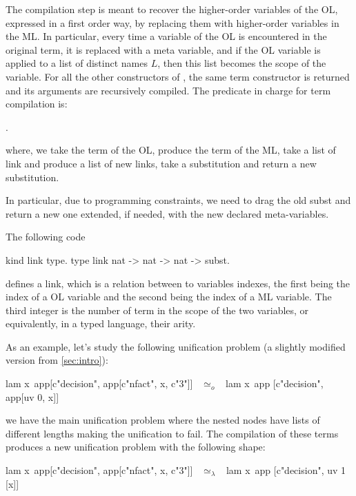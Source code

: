 \documentclass[sigconf,natbib=false,review]{acmart}
\newcommand{\UnifRel}{\ensuremath{\simeq}}
\newcommand{\Uo}{\ensuremath{\UnifRel_o}\xspace}
\newcommand{\Ue}{\ensuremath{\UnifRel_\lambda}\xspace}
\begin{document}
The compilation step is meant to recover the higher-order variables of the OL,
expressed in a first order way, by replacing them with higher-order variables in
the ML. In particular, every time a variable of the OL is encountered in the
original term, it is replaced with a meta variable, and if the OL variable is
applied to a list of distinct names $L$, then this list becomes the scope of the variable. 
For all the other constructors of
, the same term constructor is returned and its arguments are
recursively compiled. The predicate in charge for term compilation is:

. 

\noindent
where, we take the term of the OL, produce the term of the ML, take a list
of link and produce a list of new links, take a substitution and return a 
new substitution.

In particular, due to programming constraints, we need to drag the old subst and
return a new one extended, if needed, with the new declared meta-variables.

The following code
%
\begin{elpicode}
  kind link type.
  type link nat -> nat -> nat -> subst.
\end{elpicode}
%
\noindent
defines a link, which is a relation between to variables indexes, the first
being the index of a OL variable and the second being the index of a ML
variable. The third integer is the number of term in the
scope of the two variables, or equivalently, in a typed language, their arity. 

As an example, let's study the following unification problem (a slightly 
modified version from \cref{sec:intro}):

\begin{elpicode}
  lam x\ app[c"decision", app[c"nfact", x, c"3"]] ~\Uo~
    lam x\ app [c"decision", app[uv 0, x]]
\end{elpicode}

\noindent
we have the main unification problem where the nested  nodes have
lists of different lengths making the unification to fail. The compilation of 
these terms produces a new unification problem with the following shape:

\begin{elpicode}
  lam x\ app[c"decision", app[c"nfact", x, c"3"]] ~\Ue~
    lam x\ app [c"decision", uv 1 [x]]
\end{elpicode}
\end{document}
